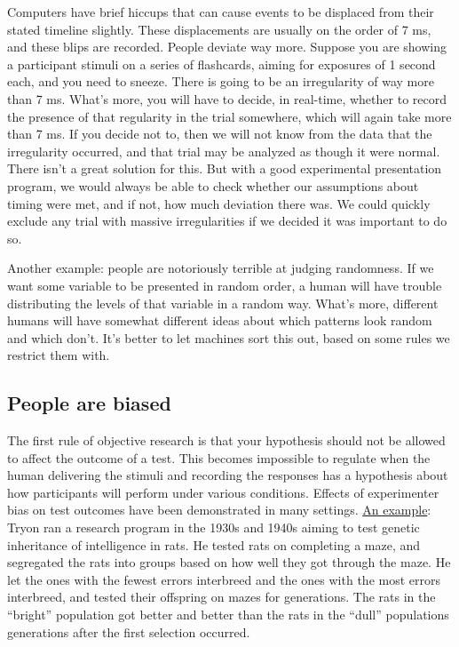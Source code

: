 \documentclass[
  12pt,
]{book}
\begin{document}
Computers have brief hiccups that can cause events to be displaced from their stated timeline slightly. These displacements are usually on the order of 7 ms, and these blips are recorded. People deviate way more. Suppose you are showing a participant stimuli on a series of flashcards, aiming for exposures of 1 second each, and you need to sneeze. There is going to be an irregularity of way more than 7 ms. What's more, you will have to decide, in real-time, whether to record the presence of that regularity in the trial somewhere, which will again take more than 7 ms. If you decide not to, then we will not know from the data that the irregularity occurred, and that trial may be analyzed as though it were normal. There isn't a great solution for this. But with a good experimental presentation program, we would always be able to check whether our assumptions about timing were met, and if not, how much deviation there was. We could quickly exclude any trial with massive irregularities if we decided it was important to do so.

Another example: people are notoriously terrible at judging randomness. If we want some variable to be presented in random order, a human will have trouble distributing the levels of that variable in a random way. What's more, different humans will have somewhat different ideas about which patterns look random and which don't. It's better to let machines sort this out, based on some rules we restrict them with.

\subsection{People are biased}\label{people-are-biased}

The first rule of objective research is that your hypothesis should not be allowed to affect the outcome of a test. This becomes impossible to regulate when the human delivering the stimuli and recording the responses has a hypothesis about how participants will perform under various conditions. Effects of experimenter bias on test outcomes have been demonstrated in many settings. \href{https://en.wikipedia.org/wiki/Tryon\%27s_Rat_Experiment}{An example}: Tryon ran a research program in the 1930s and 1940s aiming to test genetic inheritance of intelligence in rats. He tested rats on completing a maze, and segregated the rats into groups based on how well they got through the maze. He let the ones with the fewest errors interbreed and the ones with the most errors interbreed, and tested their offspring on mazes for generations. The rats in the ``bright'' population got better and better than the rats in the ``dull'' populations generations after the first selection occurred.
\end{document}
